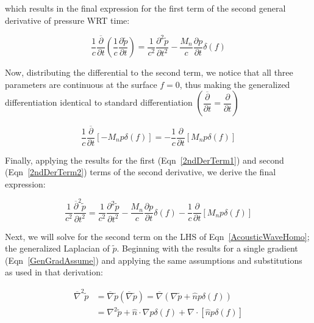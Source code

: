 \documentclass[]{aiaa-tc}%
\begin{document}
\noindent which results in the final expression for the first term of the second general derivative of pressure WRT time:

\begin{equation} \label{2ndDerTerm1}
\dfrac{1}{c}\dfrac{\overline{\partial}}{\partial t}
    \left( \dfrac{1}{c}\dfrac{\partial\widetilde{p}}{\partial t} \right)
=  \dfrac{1}{c^2} \dfrac{\partial^2\widetilde{p}}{\partial t^2}
    - \dfrac{M_n}{c} \dfrac{\partial p}{\partial t}  \delta(f)
\end{equation}


Now, distributing the differential to the second term, we notice that all three parameters are continuous at the surface $f=0$, thus making the generalized differentiation identical to standard differentiation $\left(\dfrac{\overline{\partial}}{\partial t} = \dfrac{\partial}{\partial t} \right)$

\begin{equation} \label{2ndDerTerm2}
\dfrac{1}{c}\dfrac{\overline{\partial}}{\partial t}\left[-M_n p\delta(f)\right]
    = -\dfrac{1}{c}\dfrac{\partial}{\partial t} \left[ M_n p\delta(f) \right]
\end{equation}

Finally, applying the results for the first (Eqn~\ref{2ndDerTerm1}) and second (Eqn~\ref{2ndDerTerm2}) terms of the second derivative, we derive the final expression:

\begin{equation} \label{2ndDer}
\dfrac{1}{c^2}\dfrac{\overline{\partial}^2\widetilde{p}}{\partial t^2}
= \dfrac{1}{c^2} \dfrac{\partial^2\widetilde{p}}{\partial t^2}
    - \dfrac{M_n}{c} \dfrac{\partial p}{\partial t}  \delta(f)
- \dfrac{1}{c}\dfrac{\partial}{\partial t} \left[ M_n p\delta(f) \right]
\end{equation}


Next, we will solve for the second term on the LHS of Eqn~\ref{AcousticWaveHomo}; the generalized Laplacian of $\widetilde{p}$.  Beginning with the results for a single gradient (Eqn~\ref{GenGradAssume}) and applying the same assumptions and substitutions as used in that derivation:

\begin{align*}
\overline{\nabla}^2 \widetilde{p}
    &= \overline{\nabla} \widetilde{p}
        \left( \overline{\nabla} \widetilde{p} \right)
    = \overline{\nabla}
        \left( \nabla\widetilde{p} + \hat{n} p \delta(f) \right) \\
&= \nabla^2\widetilde{p} + \hat{n}\cdot\nabla p \delta(f)
    + \nabla\cdot \left[ \hat{n} p \delta(f) \right]
\end{align*}
\end{document}
